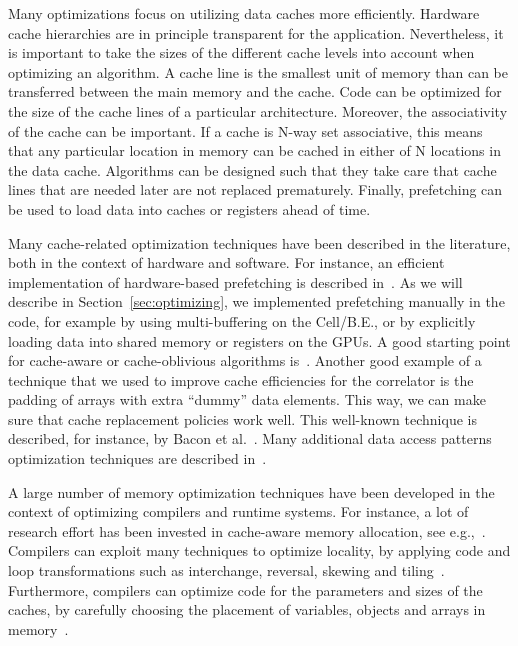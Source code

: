 \documentclass{article}
\begin{document}
Many optimizations focus on utilizing data caches more efficiently.
Hardware cache hierarchies are in principle transparent for the
application. Nevertheless, it is important to take the sizes of the
different cache levels into account when optimizing an algorithm.
A cache line is the smallest unit of memory than can be transferred
between the main memory and the cache.  
Code can be optimized for the size of the cache lines of a particular architecture. 
Moreover, the associativity of
the cache can be important.  If a cache is N-way set associative, this
means that any particular location in memory can be cached in either
of N locations in the data cache. Algorithms can be designed such that
they take care that cache lines that are needed later are not
replaced prematurely.  Finally, prefetching can be used to load data into caches
or registers ahead of time.

Many cache-related optimization techniques have been described in the
literature, both in the context of hardware and software. For instance,
an efficient implementation of hardware-based prefetching is described
in~\cite{Chen95effectivehardware-based}.  As we will describe in
Section~\ref{sec:optimizing}, we implemented prefetching manually in the code, for
example by using multi-buffering on the Cell/B.E., or by explicitly
loading data into shared memory or registers on the GPUs.  A good
starting point for cache-aware or cache-oblivious algorithms
is~\cite{cache}. Another good example of a technique that we used to
improve cache efficiencies for the correlator is the padding of arrays
with extra ``dummy'' data elements. This way, we can make sure that
cache replacement policies work well. This well-known technique
is described, for instance, by Bacon et al.~\cite{cache-tlb-compiler}.
Many additional data access patterns optimization techniques are described
in~\cite{data-access}.

A large number of memory optimization techniques have been developed in the context
of optimizing compilers and runtime systems. For instance, a lot of
research effort has been invested in cache-aware memory allocation, see
e.g.,~\cite{Wilson95dynamicstorage}.  Compilers can exploit many
techniques to optimize locality, by applying code and loop
transformations such as interchange, reversal, skewing and
tiling~\cite{data-locality}.  Furthermore, compilers can optimize code for
the parameters and sizes of the caches, by carefully choosing the
placement of variables, objects and arrays in
memory~\cite{Panda96memorydata}.
\end{document}
